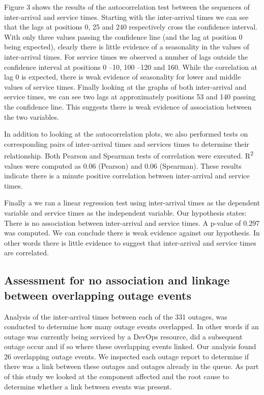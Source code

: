 \documentclass[5p]{elsarticle}
\begin{document}
Figure 3 shows the results of the autocorrelation test between the sequences of inter-arrival and service times. Starting with the inter-arrival times we can see that the lags at positions 0, 25 and 240 respectively cross the confidence interval. With only three values passing the confidence line (and the lag at position 0 being expected), clearly there is little evidence of a seasonality in the values of inter-arrival times. For service times we observed a number of lags outside the confidence interval at positions 0 --10, 100 --120 and 160. While the correlation at lag 0 is expected, there is weak evidence of seasonality for lower and middle values of service times. Finally looking at the graphs of both inter-arrival and service times, we can see two lags at approximately positions 53 and 140 passing the confidence line. This suggests there is weak evidence of association between the two variables.

In addition to looking at the autocorrelation plots, we also performed tests on corresponding pairs of inter-arrival times and services times to determine their relationship. Both Pearson and Spearman tests of correlation were executed. R\textsuperscript{2} values were computed as 0.06 (Pearson) and 0.06 (Spearman). These results indicate there is a minute positive correlation between inter-arrival and service times.

Finally a we ran a linear regression test using inter-arrival times as the dependent variable and service times as the independent variable. Our hypothesis states: There is no association between inter-arrival and service times. A p-value of 0.297 was computed. We can conclude there is weak evidence against our hypothesis. In other words there is little evidence to suggest that inter-arrival and service times are correlated. 

\subsection{Assessment for no association and linkage between overlapping outage events}

Analysis of the inter-arrival times between each of the 331 outages, was conducted to determine how many outage events overlapped. In other words if an outage was currently being serviced by a DevOps resource, did a subsequent outage occur and if so where these overlapping events linked. Our analysis found 26 overlapping outage events. We inspected each outage report to determine if there was a link between these outages and outages already in the queue. As part of this study we looked at the component affected and the root cause to determine whether a link between events was present. 
\end{document}
